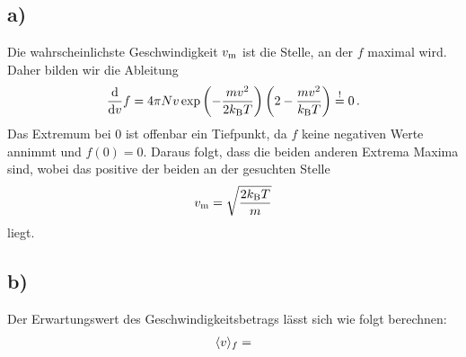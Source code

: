 \documentclass[a4paper, 11pt]{article}
\DeclarePairedDelimiter{\ev}{\langle}{\rangle}
\begin{document}
\subsection*{a)}
Die wahrscheinlichste Geschwindigkeit $v_\textup{m}$ ist die Stelle, an der $f$ maximal wird. Daher bilden wir die Ableitung
\begin{equation}
    \frac{\textup{d}}{\textup{d}v}f = 4\pi Nv\exp\left(-\frac{m v^2}{2 k_\textup{B}T}\right)\left(2 - \frac{mv^2}{k_\textup{B}T}\right) \stackrel{\textup{!}}{=} 0 \,.
\end{equation}
Das Extremum bei 0 ist offenbar ein Tiefpunkt, da $f$ keine negativen Werte annimmt und $f(0) = 0$. Daraus folgt, dass die beiden anderen Extrema Maxima sind, wobei das positive der beiden an der gesuchten Stelle
\begin{equation}
    v_\textup{m} = \sqrt{\frac{2 k_\textup{B} T}{m}} 
    \label{eqn:v_m}
\end{equation}
liegt.
\subsection*{b)}
Der Erwartungswert des Geschwindigkeitsbetrags lässt sich wie folgt berechnen:
\begin{align}
    \ev{v}_f = 
\end{align}
\end{document}
